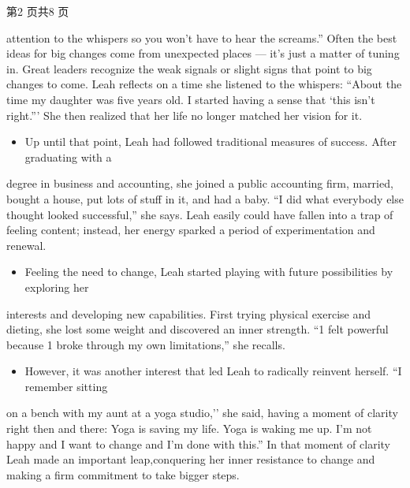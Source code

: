 \documentclass[UTF8,11pt]{ctexart}
\begin{document}
第2 页共8 页


attention to the whispers so you won’t have to hear the screams.” Often the best ideas for big changes come from unexpected places — it’s just a matter of tuning in. Great leaders recognize the weak signals or slight signs that point to big changes to come. Leah reflects on a time she listened to the whispers: “About the time my daughter was five years old. I started having a sense that ‘this isn’t right.”’ She then realized that her life no longer matched her vision for it.


\begin{itemize}[leftmargin=2em,itemsep=.2em,topsep=.4em]\item[D.] Up until that point, Leah had followed traditional measures of success. After graduating with a
\end{itemize}

degree in business and accounting, she joined a public accounting firm, married, bought a house, put lots of stuff in it, and had a baby. “I did what everybody else thought looked successful,” she says. Leah easily could have fallen into a trap of feeling content; instead, her energy sparked a period of experimentation and renewal.


\begin{itemize}[leftmargin=2em,itemsep=.2em,topsep=.4em]\item[E.] Feeling the need to change, Leah started playing with future possibilities by exploring her
\end{itemize}

interests and developing new capabilities. First trying physical exercise and dieting, she lost some weight and discovered an inner strength. “1 felt powerful because 1 broke through my own limitations,” she recalls.


\begin{itemize}[leftmargin=2em,itemsep=.2em,topsep=.4em]\item[F.] However, it was another interest that led Leah to radically reinvent herself. “I remember sitting
\end{itemize}

on a bench with my aunt at a yoga studio,’’ she said, having a moment of clarity right then and there: Yoga is saving my life. Yoga is waking me up. I’m not happy and I want to change and I’m done with this.” In that moment of clarity Leah made an important leap,conquering her inner resistance to change and making a firm commitment to take bigger steps.
\end{document}
